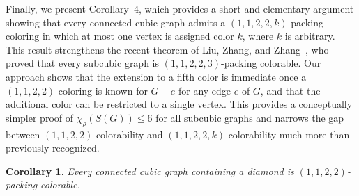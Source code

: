 \documentclass[12pt, oneside]{scrartcl}
\newtheorem{corollary}{Corollary}%
\begin{document}
Finally, we present Corollary~4, which provides a short and elementary argument showing that every connected cubic graph admits a $(1,1,2,2,k)$-packing coloring in which at most one vertex is assigned color $k$, where $k$ is arbitrary. This result strengthens the recent theorem of Liu, Zhang, and Zhang~\cite{LZZ24}, who proved that every subcubic graph is $(1,1,2,2,3)$-packing colorable. Our approach shows that the extension to a fifth color is immediate once a $(1,1,2,2)$-coloring is known for $G-e$ for any edge $e$ of $G$, and that the additional color can be restricted to a single vertex. This provides a conceptually simpler proof of $\chi_\rho(S(G)) \leq 6$ for all subcubic graphs and narrows the gap between $(1,1,2,2)$-colorability and $(1,1,2,2,k)$-colorability much more than previously recognized.
\begin{corollary}\label{corollary 1}
    Every connected cubic graph containing a diamond is $(1,1,2,2)$-packing colorable.
\end{corollary}
\end{document}
